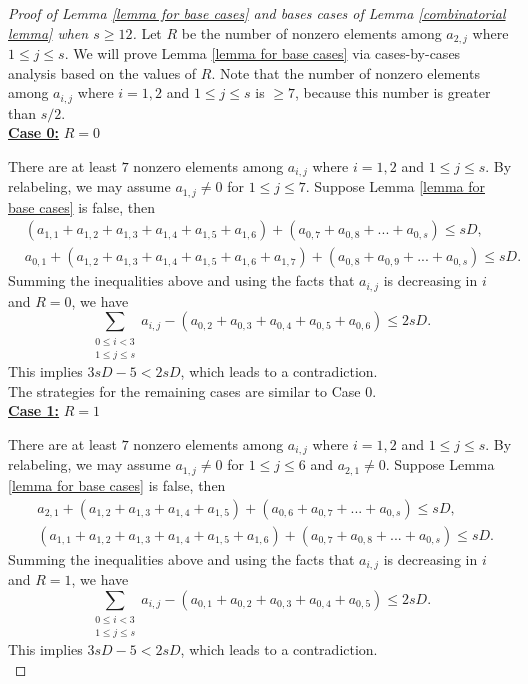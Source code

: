 \documentclass[11pt]{amsart}
\theoremstyle{plain} %
\theoremstyle{remark}
\numberwithin{equation}{section}
\begin{document}
\begin{proof}[Proof of Lemma \ref{lemma for base cases} and bases cases of Lemma \ref{combinatorial lemma} when $s\geq 12$]
    Let $R$ be the number of nonzero elements among $a_{2,j}$ where $1\leq j\leq s$. We will prove Lemma \ref{lemma for base cases} via cases-by-cases analysis based on the values of $R$. Note that the number of nonzero elements among $a_{i,j}$ where $i=1,2$ and $1\leq j\leq s$ is $\geq 7$, because this number is greater than $s/2$.\\

    \noindent\underline{\textbf{Case 0:}} $R=0$

    There are at least $7$ nonzero elements among $a_{i,j}$ where $i=1,2$ and $1\leq j\leq s$. By relabeling, we may assume $a_{1,j}\neq 0$ for $1\leq j\leq 7$. Suppose Lemma \ref{lemma for base cases} is false, then
    \begin{align*}
        &(a_{1,1}+a_{1,2}+a_{1,3}+a_{1,4}+a_{1,5}+a_{1,6})+(a_{0,7}+a_{0,8}+...+a_{0,s})\leq sD,\\
        &a_{0,1}+(a_{1,2}+a_{1,3}+a_{1,4}+a_{1,5}+a_{1,6}+a_{1,7})+(a_{0,8}+a_{0,9}+...+a_{0,s})\leq sD.
    \end{align*}
    Summing the inequalities above and using the facts that $a_{i,j}$ is decreasing in $i$ and $R=0$, we have
    \begin{equation*}
        \sum_{\substack{0\leq i<3\\1\leq j\leq s}}a_{i,j}-(a_{0,2}+a_{0,3}+a_{0,4}+a_{0,5}+a_{0,6})\leq 2sD.
    \end{equation*}
    This implies $3sD-5<2sD$, which leads to a contradiction.\\

    The strategies for the remaining cases are similar to Case $0$.\\

    \noindent\underline{\textbf{Case 1:}} $R=1$

    There are at least $7$ nonzero elements among $a_{i,j}$ where $i=1,2$ and $1\leq j\leq s$. By relabeling, we may assume $a_{1,j}\neq 0$ for $1\leq j\leq 6$ and $a_{2,1}\neq 0$. Suppose Lemma \ref{lemma for base cases} is false, then
    \begin{align*}
        &a_{2,1}+(a_{1,2}+a_{1,3}+a_{1,4}+a_{1,5})+(a_{0,6}+a_{0,7}+...+a_{0,s})\leq sD,\\
        &(a_{1,1}+a_{1,2}+a_{1,3}+a_{1,4}+a_{1,5}+a_{1,6})+(a_{0,7}+a_{0,8}+...+a_{0,s})\leq sD.
    \end{align*}
    Summing the inequalities above and using the facts that $a_{i,j}$ is decreasing in $i$ and $R=1$, we have
    \begin{equation*}
        \sum_{\substack{0\leq i<3\\1\leq j\leq s}}a_{i,j}-(a_{0,1}+a_{0,2}+a_{0,3}+a_{0,4}+a_{0,5})\leq 2sD.
    \end{equation*}
    This implies $3sD-5<2sD$, which leads to a contradiction.\\


\end{proof}
\end{document}
